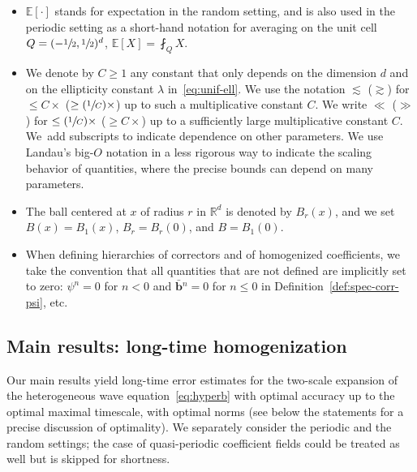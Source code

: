 \documentclass[JEP,XML,SOM,Unicode,published]{cedram}
\newcommand{\Psfrac}[2]{(\sfrac{#1}{#2})}
\theoremstyle{plain}
\theoremstyle{definition}
\numberwithin{equation}{section}
\newcommand{\R}{\mathbb R}
\newcommand{\bb}{{\boldsymbol b}}
\newcommand{\expec}[1]{\mathbb{E}\left[ #1 \right]}
\begin{document}
\begin{itemize}
\item $\expec{\cdot}$ stands for expectation in the random setting, and is also used in the periodic setting as a short-hand notation for averaging on the unit cell $Q=(-\sfrac12,\sfrac12)^d$, $\expec{X}=\fint_Q X$.
\item We denote by $C\ge1$ any constant that only depends on the dimension $d$ and on the ellipticity constant $\lambda$ in~\eqref{eq:unif-ell}. We use the notation $\lesssim$ (\resp $\gtrsim$) for $\le C\times$ (\resp $\ge\Psfrac1C\times$) up to such a multiplicative constant $C$. We write $\ll$ (\resp $\gg$) for $\le \Psfrac1C\times$ (\resp $\ge C\times$) up to a sufficiently large multiplicative constant $C$. We~add subscripts to indicate dependence on other parameters. {We use Landau's big-$O$ notation in a less rigorous way to indicate the scaling behavior of quantities, where the precise bounds can depend on many parameters.}
\item The ball centered at $x$ of radius $r$ in $\R^d$ is denoted by $B_r(x)$, and we set $B(x)=B_1(x)$, $B_r=B_r(0)$, and $B=B_1(0)$.
\item When defining hierarchies of correctors and of homogenized coefficients, we take the convention that all quantities that are not defined are implicitly set to zero: \eg $\psi^n=0$ for $n<0$ and $\bar\bb{}^n=0$ for $n\le0$ in Definition~\ref{def:spec-corr-psi}, etc.
\end{itemize}

\subsection{Main results: long-time homogenization}\label{sec:main-res}
Our main results yield long-time error estimates for the two-scale expansion of the heterogeneous wave
equation~\eqref{eq:hyperb} with optimal accuracy up to the optimal maximal timescale, { with optimal norms (see below the statements for a precise discussion of optimality)}. We separately consider the periodic and the random settings; the case of quasi-periodic coefficient fields could be treated as well but is skipped for shortness.
\end{document}
